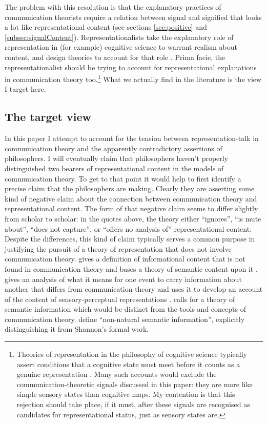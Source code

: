 \documentclass[12pt]{article}
\begin{document}
The problem with this resolution is that the explanatory practices of communication theorists require a relation between signal and signified that looks a lot like representational content (see sections \ref{sec:positive} and \ref{subsec:signalContent}).
Representationalists take the explanatory role of representation in (for example) cognitive science to warrant realism about content, and design theories to 
account for that role \citep{burge2010origins,shea2018representation}.
Prima facie, the representationalist should be trying to account for representational explanations in communication theory too.\footnote{Theories of representation in the philosophy of cognitive science typically assert conditions that a cognitive state must meet before it counts as a genuine representation \citep{shea2018representation,burge2010origins,piccinini2020nonnatural,desouzafilho2022dual}. Many such accounts would exclude the communication-theoretic signals discussed in this paper: they are more like simple sensory states than cognitive maps. My contention is that this rejection should take place, if it must, after these signals are recognised as candidates for representational status, just as sensory states are.}
What we actually find in the literature is the view I target here.

\subsection{The target view}

In this paper I attempt to account for the tension between representation-talk in communication theory and the apparently contradictory assertions of philosophers.
I will eventually claim that philosophers haven't properly distinguished two bearers of representational content in the models of communication theory.
To get to that point it would help to first identify a precise claim that the philosophers are making.
Clearly they are asserting some kind of negative claim about the connection between communication theory and representational content.
The form of that negative claim seems to differ slightly from scholar to scholar: in the quotes above, the theory either ``ignores'', ``is mute about'', ``does not capture'', or ``offers no analysis of'' representational content.
Despite the differences, this kind of claim typically serves a common purpose in justifying the pursuit of a theory of representation that does not involve communication theory.
\citet[65]{dretske1981knowledge} gives a definition of informational content that is not found in communication theory and bases a theory of semantic content upon it \citep[$\S7$]{dretske1981knowledge}.
\citet[142]{neander2017mark} gives an analysis of what it means for one event to carry information about another that differs from communication theory and uses it to develop an account of the content of sensory-perceptual representations \citep[$\S\S$7-9]{neander2017mark}.
\citet[$\S$6]{dennett2017bacteria} calls for a theory of semantic information which would be distinct from the tools and concepts of communication theory.
\citet[$\S$4.2.2]{piccinini2011information} define ``non-natural semantic information'', explicitly distinguishing it from Shannon's formal work.
\end{document}
